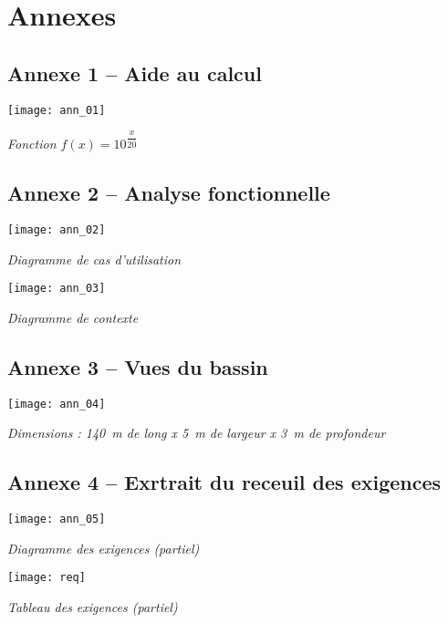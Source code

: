 \section*{Annexes}
\subsection*{Annexe 1 -- Aide au calcul}
\begin{center}
\texttt{[image: ann\_01]}

\textit{Fonction $f(x)=10^{\dfrac{x}{20}}$}
\end{center}

\subsection*{Annexe 2 -- Analyse fonctionnelle}
\begin{multicols}{2}
\begin{center}
\texttt{[image: ann\_02]}

\textit{Diagramme de cas d'utilisation}
\end{center}

\begin{center}
\texttt{[image: ann\_03]}

\textit{Diagramme de contexte}
\end{center}
\end{multicols}
\subsection*{Annexe 3 -- Vues du bassin}
\begin{center}
\texttt{[image: ann\_04]}

\textit{Dimensions : \SI{140}{m} de long x \SI{5}{m} de largeur x \SI{3}{m} de profondeur }
\end{center}

\subsection*{Annexe 4 -- Exrtrait du receuil des exigences}
\begin{center}
\texttt{[image: ann\_05]}

\textit{Diagramme des exigences (partiel) }
\end{center}
\begin{center}
\texttt{[image: req]}

\textit{Tableau des exigences (partiel)}
\end{center}


